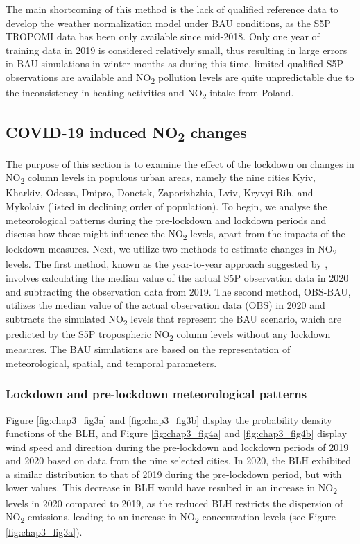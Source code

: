 The main shortcoming of this method is the lack of qualified reference data to develop the weather normalization model under BAU conditions, as the S5P TROPOMI data has been only available since mid-2018. Only one year of training data in 2019 is considered relatively small, thus resulting in large errors in BAU simulations in winter months as during this time, limited qualified S5P observations are available and NO\textsubscript{2} pollution levels are quite unpredictable due to the inconsistency in heating activities and NO\textsubscript{2} intake from Poland.\par
\subsection{COVID-19 induced NO\textsubscript{2} changes} \label{chap3_covid}
The purpose of this section is to examine the effect of the lockdown on changes in NO\textsubscript{2} column levels in populous urban areas, namely the nine cities Kyiv, Kharkiv, Odessa, Dnipro, Donetsk, Zaporizhzhia, Lviv, Kryvyi Rih, and Mykolaiv (listed in declining order of population). To begin, we analyse the meteorological patterns during the pre-lockdown and lockdown periods and discuss how these might influence the NO\textsubscript{2} levels, apart from the impacts of the lockdown measures. Next, we utilize two methods to estimate changes in NO\textsubscript{2} levels. The first method, known as the year-to-year approach suggested by \citep{barre2021estimating}, involves calculating the median value of the actual S5P observation data in 2020 and subtracting the observation data from 2019. The second method, OBS-BAU, utilizes the median value of the actual observation data (OBS) in 2020 and subtracts the simulated NO\textsubscript{2} levels that represent the BAU scenario, which are predicted by the S5P tropospheric NO\textsubscript{2} column levels without any lockdown measures. The BAU simulations are based on the representation of meteorological, spatial, and temporal parameters. \par
\subsubsection*{Lockdown and pre-lockdown meteorological patterns}
Figure \ref{fig:chap3_fig3a} and \ref{fig:chap3_fig3b} display the probability density functions of the BLH, and Figure \ref{fig:chap3_fig4a} and \ref{fig:chap3_fig4b} display wind speed and direction during the pre-lockdown and lockdown periods of 2019 and 2020 based on data from the nine selected cities. In 2020, the BLH exhibited a similar distribution to that of 2019 during the pre-lockdown period, but with lower values. This decrease in BLH would have resulted in an increase in NO\textsubscript{2} levels in 2020 compared to 2019, as the reduced BLH restricts the dispersion of NO\textsubscript{2} emissions, leading to an increase in NO\textsubscript{2} concentration levels (see Figure \ref{fig:chap3_fig3a}). \par

